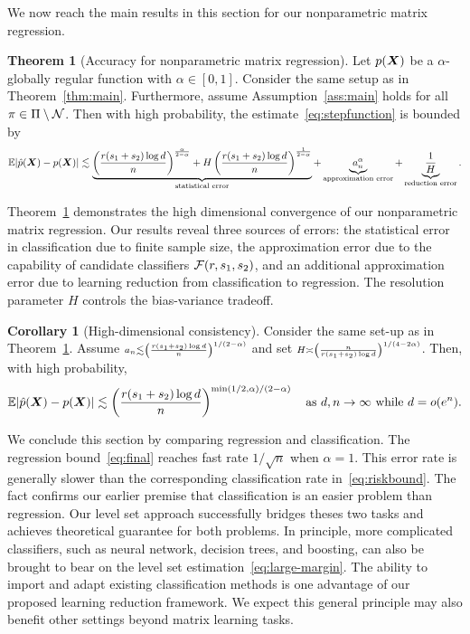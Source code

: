 \documentclass[11pt]{article}
\newcommand*{\KeepStyleUnderBrace}[1]{%
\mathop{%
\mathchoice
{\underbrace{\displaystyle#1}}%
{\underbrace{\textstyle#1}}%
{\underbrace{\scriptstyle#1}}%
{\underbrace{\scriptscriptstyle#1}}%
}\limits
}
\theoremstyle{definition}
\newtheorem{thm}{Theorem}[section]
\newtheorem{corollary}{Corollary}[section]
\begin{document}
We now reach the main results in this section for our nonparametric matrix regression. 

\begin{thm}[Accuracy for nonparametric matrix regression]\label{thm:regression} Let $p(\bm X)$ be a $\alpha$-globally regular function with $\alpha\in[0,1]$. Consider the same setup as in Theorem~\ref{thm:main}. Furthermore, assume Assumption~\ref{ass:main} holds for all $\pi\in\Pi\setminus \mathcal{N}$. Then with high probability, the estimate~\eqref{eq:stepfunction} is bounded by
\[
\mathbb{E}|\hat p(\mX)- p(\mX)| \lesssim  \KeepStyleUnderBrace{
\left({r(s_1+s_2)\log d\over n}\right)^{\alpha\over 2-\alpha}+H\left({r(s_1+s_2)\log d\over n}\right)^{1\over 2-\alpha}}_{\text{statistical error}} + \KeepStyleUnderBrace{a^\alpha_n}_{\text{approximation error}}+\KeepStyleUnderBrace{{1\over H}}_{\text{reduction error}}.
\]
\end{thm}

Theorem~\ref{thm:regression} demonstrates the high dimensional convergence of our nonparametric matrix regression. Our results reveal three sources of errors: the statistical error in classification due to finite sample size, the approximation error due to the capability of candidate classifiers $\mathcal{F}(r,s_1,s_2)$, and an additional approximation error due to learning reduction from classification to regression. The resolution parameter $H$ controls the bias-variance tradeoff. 

\begin{corollary}[High-dimensional consistency] Consider the same set-up as in Theorem~\ref{thm:regression}. Assume $\scriptstyle a_n \lesssim \left({r(s_1+s_2)\log d \over n}\right)^{1/(2-\alpha)}$ and set $\scriptstyle H\asymp \left({n\over r(s_1+s_2) \log d}\right)^{1/(4-2\alpha)}$. Then, with high probability,
\begin{equation}\label{eq:final}
\mathbb{E}|\hat p(\mX)- p(\mX)| \lesssim \left({r(s_1+s_2)\log d \over n}\right)^{\min(1/2,\alpha)/(2-\alpha)} \quad \text{as }d, n\to\infty \text{ while } d=o(e^{n}).
\vspace{-.3cm}
\end{equation}
\end{corollary}
We conclude this section by comparing regression and classification. The regression bound~\eqref{eq:final} reaches fast rate $1/\sqrt{n}$ when $\alpha=1$. This error rate is generally slower than the corresponding classification rate in~\eqref{eq:riskbound}. The fact confirms our earlier premise that classification is an easier problem than regression. Our level set approach successfully bridges theses two tasks and achieves theoretical guarantee for both problems. In principle, more complicated classifiers, such as neural network, decision trees, and boosting, can also be brought to bear on the level set estimation~\eqref{eq:large-margin}. The ability to import and adapt existing classification methods is one advantage of our proposed learning reduction framework. We expect this general principle may also benefit other settings beyond matrix learning tasks.  
\end{document}
